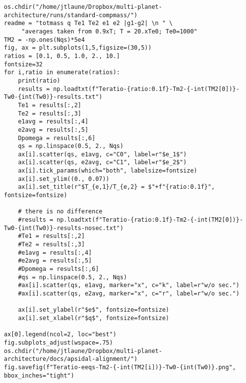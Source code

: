 \documentclass[11pt]{article}
\begin{document}
\begin{verbatim}
os.chdir("/home/jtlaune/Dropbox/multi-planet-architecture/runs/standard-compmass/")
readme = "totmass q Te1 Te2 e1 e2 |g1-g2| \n " \
	 "averages taken from 0.9xT; T = 20.xTe0; Te0=1000"
TM2 = -np.ones(Nqs)*5e4
fig, ax = plt.subplots(1,5,figsize=(30,5))
ratios = [0.1, 0.5, 1.0, 2., 10.]
fontsize=32
for i,ratio in enumerate(ratios):
    print(ratio)
    results = np.loadtxt(f"Teratio-{ratio:0.1f}-Tm2-{-int(TM2[0])}-Tw0-{int(Tw0)}-results.txt")
    Te1 = results[:,2]
    Te2 = results[:,3]
    e1avg = results[:,4]
    e2avg = results[:,5]
    Dpomega = results[:,6]
    qs = np.linspace(0.5, 2., Nqs)
    ax[i].scatter(qs, e1avg, c="C0", label=r"$e_1$")
    ax[i].scatter(qs, e2avg, c="C1", label=r"$e_2$")
    ax[i].tick_params(which="both", labelsize=fontsize)
    ax[i].set_ylim((0., 0.07))
    ax[i].set_title(r"$T_{e,1}/T_{e,2} = $"+f"{ratio:0.1f}", fontsize=fontsize)

    # there is no difference
    #results = np.loadtxt(f"Teratio-{ratio:0.1f}-Tm2-{-int(TM2[0])}-Tw0-{int(Tw0)}-results-nosec.txt")
    #Te1 = results[:,2]
    #Te2 = results[:,3]
    #e1avg = results[:,4]
    #e2avg = results[:,5]
    #Dpomega = results[:,6]
    #qs = np.linspace(0.5, 2., Nqs)
    #ax[i].scatter(qs, e1avg, marker="x", c="k", label=r"w/o sec.")
    #ax[i].scatter(qs, e2avg, marker="x", c="r", label=r"w/o sec.")

    ax[i].set_ylabel(r"$e$", fontsize=fontsize)
    ax[i].set_xlabel(r"$q$", fontsize=fontsize)

ax[0].legend(ncol=2, loc="best")
fig.subplots_adjust(wspace=.75)
os.chdir("/home/jtlaune/Dropbox/multi-planet-architecture/docs/apsidal-alignment/")
fig.savefig(f"Teratio-eeqs-Tm2-{-int(TM2[i])}-Tw0-{int(Tw0)}.png", bbox_inches="tight")
\end{verbatim}
\end{document}
